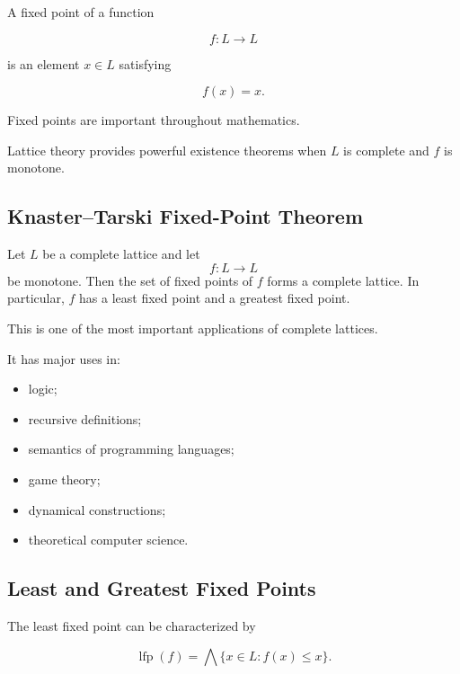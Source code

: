 A fixed point of a function

\[ f:L\to L \]

is an element \(x\in L\) satisfying

\[ f(x)=x. \]

Fixed points are important throughout mathematics.

Lattice theory provides powerful existence theorems when \(L\) is complete
and \(f\) is monotone.

\subsection{Knaster--Tarski Fixed-Point Theorem}
\label{subsec:knaster-tarski}

\begin{theorem}
Let \(L\) be a complete lattice and let
\[ f:L\to L \]
be monotone. Then the set of fixed points of \(f\) forms a complete lattice.
In particular, \(f\) has a least fixed point and a greatest fixed point.
\end{theorem}

This is one of the most important applications of complete lattices.

It has major uses in:

\begin{itemize}
    \item logic;
    \item recursive definitions;
    \item semantics of programming languages;
    \item game theory;
    \item dynamical constructions;
    \item theoretical computer science.
\end{itemize}

\subsection{Least and Greatest Fixed Points}
\label{subsec:least-greatest-fixed-points}

The least fixed point can be characterized by

\[ \operatorname{lfp}(f)
=\bigwedge\{x\in L:f(x)\leq x\}. \]


